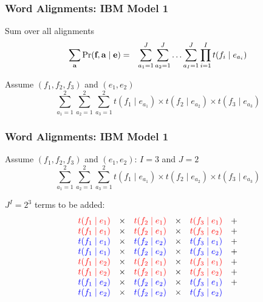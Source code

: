 \begin{frame}
\frametitle{Word Alignments: IBM Model 1}
\begin{block}{Sum over all alignments}
\begin{eqnarray*}
\sum_{\textbf{a}} \Pr(\textbf{f}, \textbf{a} \mid \textbf{e}) & = & 
\sum_{a_1 = 1}^J \sum_{a_2 = 1}^J \ldots \sum_{a_I = 1}^J \prod_{i=1}^I t(f_i \mid e_{a_i}) 
\end{eqnarray*}
\end{block}\pause
\begin{block}{Assume $(f_1, f_2, f_3)$ and $(e_1, e_2)$}
\[ \sum_{a_1=1}^2 \sum_{a_2=1}^2 \sum_{a_3=1}^2 t(f_1 \mid e_{a_1}) \times t(f_2 \mid e_{a_2}) \times t(f_3 \mid e_{a_3}) \]
\end{block}
\end{frame}

\begin{frame}
\frametitle{Word Alignments: IBM Model 1}
\begin{block}{Assume $(f_1, f_2, f_3)$ and $(e_1, e_2)$: $I=3$ and $J=2$}
\[ \sum_{a_1=1}^2 \sum_{a_2=1}^2 \sum_{a_3=1}^2 t(f_1 \mid e_{a_1}) \times t(f_2 \mid e_{a_2}) \times t(f_3 \mid e_{a_3}) \]
\end{block}
\begin{block}{$J^I = 2^3$ terms to be added:}
\[ 
\begin{array}{cccccc}
\color{red} t(f_1 \mid e_1) & \times & \color{red} t(f_2 \mid e_1) & \times & \color{red} t(f_3 \mid e_1) & + \\
\color{red} t(f_1 \mid e_1) & \times & \color{red} t(f_2 \mid e_1) & \times & \color{red} t(f_3 \mid e_2) & + \\
\color{blue} t(f_1 \mid e_1) & \times & \color{blue} t(f_2 \mid e_2) & \times & \color{blue} t(f_3 \mid e_1) & + \\
\color{blue} t(f_1 \mid e_1) & \times & \color{blue} t(f_2 \mid e_2) & \times & \color{blue} t(f_3 \mid e_2) & + \\
\color{red} t(f_1 \mid e_2) & \times & \color{red} t(f_2 \mid e_1) & \times & \color{red} t(f_3 \mid e_1) & + \\
\color{red} t(f_1 \mid e_2) & \times & \color{red} t(f_2 \mid e_1) & \times & \color{red} t(f_3 \mid e_2) & + \\
\color{blue} t(f_1 \mid e_2) & \times & \color{blue} t(f_2 \mid e_2) & \times & \color{blue} t(f_3 \mid e_1) & + \\
\color{blue} t(f_1 \mid e_2) & \times & \color{blue} t(f_2 \mid e_2) & \times & \color{blue} t(f_3 \mid e_2) & \\
\end{array}
\]
\end{block}
\end{frame}

